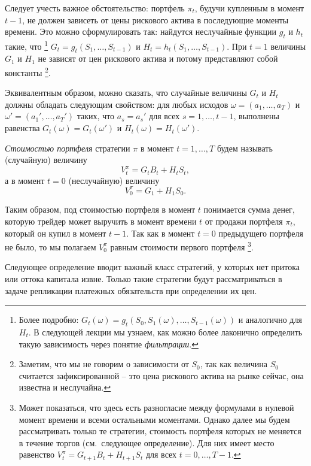 Следует учесть важное обстоятельство: портфель $\pi_t$, будучи купленным в момент $t-1$, не должен зависеть от цены рискового актива в последующие моменты времени.
Это можно сформулировать так: найдутся неслучайные функции $g_t$ и $h_t$ такие, что%
\footnote{Более подробно: $G_t(\omega) = g_t(S_0, S_1(\omega), \dots, S_{t-1}(\omega))$ и аналогично для $H_t$.
В следующей лекции мы узнаем, как можно более лаконично определить такую зависимость через понятие \emph{фильтрации}.}
$G_t=g_t(S_1,\dots,S_{t-1})$ и $H_t=h_t(S_1,\dots,S_{t-1})$.
При $t=1$ величины $G_1$ и $H_1$ не зависят от цен рискового актива и потому представляют собой константы%
\footnote{Заметим, что мы не говорим о зависимости от $S_0$, так как величина $S_0$ считается зафиксированной -- это цена рискового актива на рынке сейчас, она известна и неслучайна.}.

Эквивалентным образом, можно сказать, что случайные величины $G_t$ и $H_t$ должны обладать следующим свойством: для любых исходов $\omega = (a_1,\dots,a_T)$ и $\omega' = (a_1',\dots,a_T')$ таких, что $a_s = a_s'$ для всех $s=1,\dots,t-1$, выполнены равенства $G_t(\omega) = G_t(\omega')$ и $H_t(\omega) = H_t(\omega')$.

\begin{definition}
\emph{Стоимостью портфеля} стратегии $\pi$ в момент $t=1,\dots,T$ будем называть (случайную) величину
\[
V_t^\pi = G_tB_t + H_t S_t,
\]
а в момент $t=0$ (неслучайную) величину
\[
V_0^\pi = G_1 + H_1 S_0.
\]
\end{definition}

Таким образом, под стоимостью портфеля в момент $t$ понимается сумма денег, которую трейдер может выручить в момент времени $t$ от продажи портфеля $\pi_t$, который он купил в момент $t-1$. Так как в момент $t=0$ предыдущего портфеля не было, то мы полагаем $V_0^\pi$ равным стоимости первого портфеля%
\footnote{Может показаться, что здесь есть разногласие между формулами в нулевой момент времени и всеми остальными моментами.
Однако далее мы будем рассматривать только те стратегии, стоимость портфеля которых не меняется в течение торгов (см.~следующее определение). Для них имеет место равенство $V_t^\pi = G_{t+1}B_t + H_{t+1}S_t$ для всех $t=0,\dots,T-1$.}.

Следующее определение вводит важный класс стратегий, у которых нет притока или оттока капитала извне.
Только такие стратегии будут рассматриваться в задаче репликации платежных обязательств при определении их цен.

